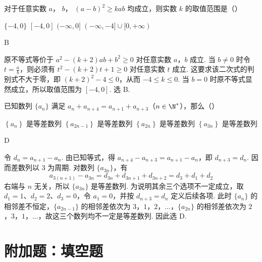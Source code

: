 \begin{problem}
对于任意实数 \( a \)， \( b \)， \( (a-b)^2 \geq kab \) 均成立，则实数 \( k \) 的取值范围是（\quad）

\choices
    {\( \{-4,0\} \)}
    {\( [-4, 0] \)}
    {\( (- \infty, 0] \)}
    {\( (- \infty, -4] \cup [0, +\infty) \)}

\begin{answer}
B
\end{answer}

\begin{solution}
原不等式等价于 \(a^2-(k+2)ab+b^2\geq0\) 对任意实数 \(a\)，\(b\) 成立. 当 \(b\neq0\) 时令 \(t=\frac ab\)，则必须有 \(t^2-(k+2)t+1\geq0\) 对任意实数 \(t\) 成立. 这要求该二次式的判别式不大于零，即 \((k+2)^2-4\leq0\)，从而 \(-4\leq k\leq0\). 当 \(b=0\) 时原不等式显然成立，所以取值范围为 \([-4,0]\). 选 B.
\end{solution}
\end{problem}

\begin{problem}
已知数列 \( \{a_{n}\} \) 满足 \( a_{n} + a_{n+4} = a_{n+1} + a_{n+3} \)（\( n \in \N^{*} \)），那么（\quad）

\choices
    {\( \left\{a_{n}\right\} \) 是等差数列}
    {\( \left\{a_{2n-1}\right\} \) 是等差数列}
    {\( \left\{a_{2n}\right\} \) 是等差数列}
    {\( \left\{a_{3n}\right\} \) 是等差数列}

\begin{answer}
D
\end{answer}

\begin{solution}
令 \(d_n=a_{n+1}-a_n\). 由已知等式，得 \(a_{n+4}-a_{n+3}=a_{n+1}-a_n\)，即 \(d_{n+3}=d_n\). 因而差数列以 3 为周期. 对数列 \(\{a_{3n}\}\)，有
\[
 a_{3(n+1)}-a_{3n}=d_{3n}+d_{3n+1}+d_{3n+2}=d_3+d_1+d_2
\]
右端与 \(n\) 无关，所以 \(\{a_{3n}\}\) 是等差数列. 为说明其余三个选项不一定成立，取 \(d_1=1\)、\(d_2=2\)、\(d_3=0\)，令 \(a_1=0\)，并按 \(d_{n+3}=d_n\) 定义后续各项. 此时 \(\{a_n\}\) 的相邻差不恒定，\(\{a_{2n-1}\}\) 的相邻差依次为 \(3\)，\(1\)，\(2\)，\(\ldots\)，\(\{a_{2n}\}\) 的相邻差依次为 \(2\)，\(3\)，\(1\)，\(\ldots\)，故这三个数列均不一定是等差数列. 因此选 D.
\end{solution}
\end{problem}

\section{附加题：填空题}

